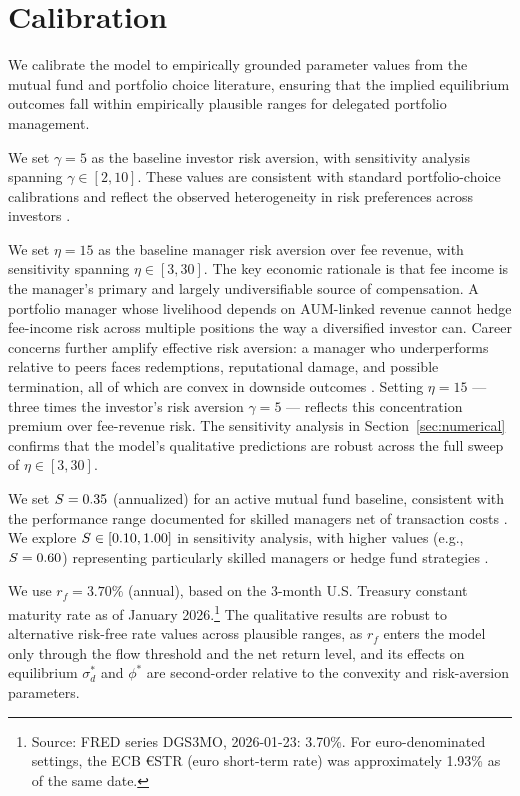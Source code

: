 \section{Calibration}
\label{sec:calibration}

We calibrate the model to empirically grounded parameter values from the mutual fund and portfolio choice literature, ensuring that the implied equilibrium outcomes fall within empirically plausible ranges for delegated portfolio management.

We set \(\gamma=5\) as the baseline investor risk aversion, with sensitivity analysis spanning \(\gamma\in[2,10]\). These values are consistent with standard portfolio-choice calibrations \citep[][]{campbell2002strategic} and reflect the observed heterogeneity in risk preferences across investors \citep[][]{guiso2018time}.

We set \(\eta=15\) as the baseline manager risk aversion over fee revenue, with sensitivity spanning \(\eta\in[3,30]\). The key economic rationale is that fee income is the manager's primary and largely undiversifiable source of compensation. A portfolio manager whose livelihood depends on AUM-linked revenue cannot hedge fee-income risk across multiple positions the way a diversified investor can. Career concerns further amplify effective risk aversion: a manager who underperforms relative to peers faces redemptions, reputational damage, and possible termination, all of which are convex in downside outcomes \citep[][]{chevalier1997risk, BrownHarlowStarks1996}. Setting \(\eta=15\) --- three times the investor's risk aversion \(\gamma=5\) --- reflects this concentration premium over fee-revenue risk. The sensitivity analysis in Section~\ref{sec:numerical} confirms that the model's qualitative predictions are robust across the full sweep of \(\eta\in[3,30]\).

We set \(S=0.35\) (annualized) for an active mutual fund baseline, consistent with the performance range documented for skilled managers net of transaction costs \citep[][]{carhart1997persistence}. We explore \(S\in[0.10,1.00]\) in sensitivity analysis, with higher values (e.g., \(S=0.60\)) representing particularly skilled managers or hedge fund strategies \citep[][]{fung2004hedge}.

We use \(r_f=3.70\%\) (annual), based on the 3-month U.S. Treasury constant maturity rate as of January 2026.\footnote{Source: FRED series DGS3MO, 2026-01-23: 3.70\%. For euro-denominated settings, the ECB €STR (euro short-term rate) was approximately 1.93\% as of the same date.} The qualitative results are robust to alternative risk-free rate values across plausible ranges, as $r_f$ enters the model only through the flow threshold and the net return level, and its effects on equilibrium $\sigma_d^*$ and $\phi^*$ are second-order relative to the convexity and risk-aversion parameters.

